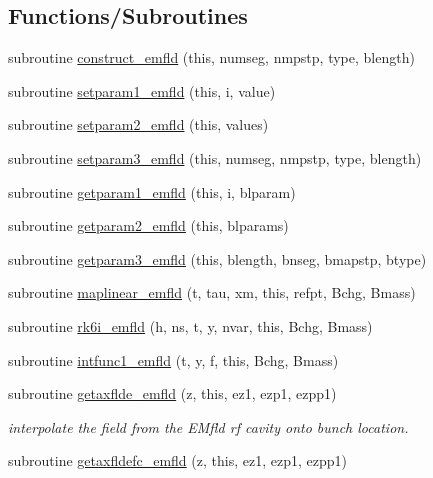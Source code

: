 \subsection*{Functions/\+Subroutines}
\begin{DoxyCompactItemize}
\item 
subroutine \mbox{\hyperlink{namespaceemfldclass_a2a7e6a32e149f3dc82fbbc59d5c6ec2d}{construct\+\_\+emfld}} (this, numseg, nmpstp, type, blength)
\item 
subroutine \mbox{\hyperlink{namespaceemfldclass_a89c21ffdad41e63e575b3bc21899f600}{setparam1\+\_\+emfld}} (this, i, value)
\item 
subroutine \mbox{\hyperlink{namespaceemfldclass_ad425987a9a6e1cb7b0b2b7b1724dc961}{setparam2\+\_\+emfld}} (this, values)
\item 
subroutine \mbox{\hyperlink{namespaceemfldclass_a3f40c1b18d4a7a28ceea11a3a6b350ad}{setparam3\+\_\+emfld}} (this, numseg, nmpstp, type, blength)
\item 
subroutine \mbox{\hyperlink{namespaceemfldclass_ae0e0b406ff0837e878753ad73fc1862d}{getparam1\+\_\+emfld}} (this, i, blparam)
\item 
subroutine \mbox{\hyperlink{namespaceemfldclass_af928aa17c18a7ebd339aece97387154b}{getparam2\+\_\+emfld}} (this, blparams)
\item 
subroutine \mbox{\hyperlink{namespaceemfldclass_a07a0d1aa7a4dc67bcec915f0d5d0945e}{getparam3\+\_\+emfld}} (this, blength, bnseg, bmapstp, btype)
\item 
subroutine \mbox{\hyperlink{namespaceemfldclass_ab283b339abd3df592d8200c244652131}{maplinear\+\_\+emfld}} (t, tau, xm, this, refpt, Bchg, Bmass)
\item 
subroutine \mbox{\hyperlink{namespaceemfldclass_ae4bfa1325df7cec4a3facbe8ebc66845}{rk6i\+\_\+emfld}} (h, ns, t, y, nvar, this, Bchg, Bmass)
\item 
subroutine \mbox{\hyperlink{namespaceemfldclass_af90bd5467acb5c62a2d93f6eb1738097}{intfunc1\+\_\+emfld}} (t, y, f, this, Bchg, Bmass)
\item 
subroutine \mbox{\hyperlink{namespaceemfldclass_a2b0b3e7b6537f3a6ea857f99288186ef}{getaxflde\+\_\+emfld}} (z, this, ez1, ezp1, ezpp1)
\begin{DoxyCompactList}\small\item\em interpolate the field from the E\+Mfld rf cavity onto bunch location. \end{DoxyCompactList}\item 
subroutine \mbox{\hyperlink{namespaceemfldclass_ae77f42a7f667c3dd902df1d26480e602}{getaxfldefc\+\_\+emfld}} (z, this, ez1, ezp1, ezpp1)

\end{DoxyCompactItemize}

